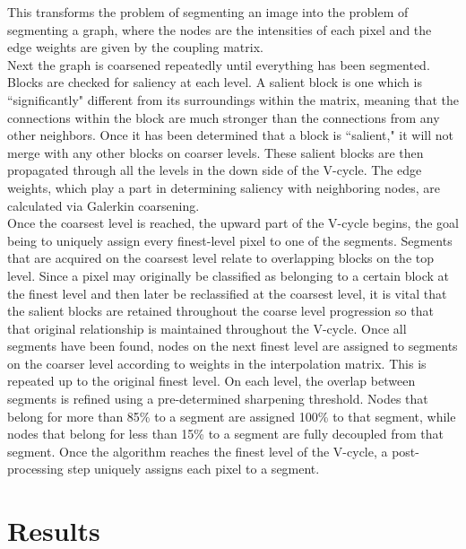 \documentclass[12pt]{article}%
\begin{document}
\noindent This transforms the problem of segmenting an image into the problem of segmenting a graph, where the nodes are the intensities of each pixel and the edge weights are given by the coupling matrix.
\vspace{5mm} \\
Next the graph is coarsened repeatedly until everything has been segmented. Blocks are checked for saliency at each level.  A salient block is one which is ``significantly" different from its surroundings within the matrix, meaning that the connections within the block are much stronger than the connections from any other neighbors. Once it has been determined that a block is ``salient," it will not merge with any other blocks on coarser levels. These salient blocks are then propagated through all the levels in the down side of the V-cycle.  The edge weights, which play a part in determining saliency with neighboring nodes, are calculated via Galerkin coarsening.  %
\vspace{5mm} \\
Once the coarsest level is reached, the upward part of the V-cycle begins, the goal being to uniquely assign every finest-level pixel to one of the segments.  Segments that are acquired on the coarsest level relate to overlapping blocks on the top level.  Since a pixel may originally be classified as belonging to a certain block at the finest level and then later be reclassified at the coarsest level, it is vital that the salient blocks are retained throughout the coarse level progression so that that original relationship is maintained throughout the V-cycle. Once all segments have been found, nodes on the next finest level are assigned to segments on the coarser level according to weights in the interpolation matrix. This is repeated up to the original finest level. On each level, the overlap between segments is refined using a pre-determined sharpening threshold.  Nodes that belong for more than 85\% to a segment are assigned 100\% to that segment, while nodes that belong for less than 15\% to a segment are fully decoupled from that segment. Once the algorithm reaches the finest level of the V-cycle, a post-processing step uniquely assigns each pixel to a segment.


\section{Results}
\end{document}
